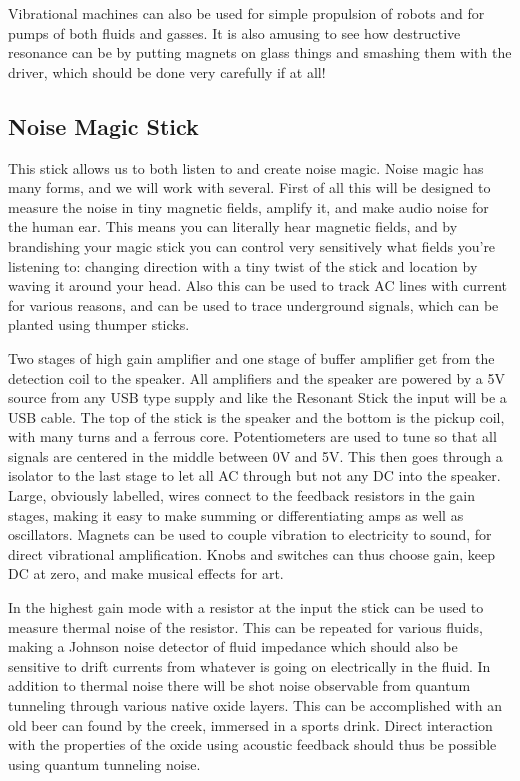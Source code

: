 Vibrational machines can also be used for simple propulsion of robots
and for pumps of both fluids and gasses. It is also amusing to see how
destructive resonance can be by putting magnets on glass things and
smashing them with the driver, which should be done very carefully if at
all!

\subsection{Noise Magic Stick}\label{noise-magic-stick}

This stick allows us to both listen to and create noise magic. Noise
magic has many forms, and we will work with several. First of all this
will be designed to measure the noise in tiny magnetic fields, amplify
it, and make audio noise for the human ear. This means you can literally
hear magnetic fields, and by brandishing your magic stick you can
control very sensitively what fields you're listening to: changing
direction with a tiny twist of the stick and location by waving it
around your head. Also this can be used to track AC lines with current
for various reasons, and can be used to trace underground signals, which
can be planted using thumper sticks.

Two stages of high gain amplifier and one stage of buffer amplifier get
from the detection coil to the speaker. All amplifiers and the speaker
are powered by a 5V source from any USB type supply and like the
Resonant Stick the input will be a USB cable. The top of the stick is
the speaker and the bottom is the pickup coil, with many turns and a
ferrous core. Potentiometers are used to tune so that all signals are
centered in the middle between 0V and 5V. This then goes through a
isolator to the last stage to let all AC through but not any DC into the
speaker. Large, obviously labelled, wires connect to the feedback
resistors in the gain stages, making it easy to make summing or
differentiating amps as well as oscillators. Magnets can be used to
couple vibration to electricity to sound, for direct vibrational
amplification. Knobs and switches can thus choose gain, keep DC at zero,
and make musical effects for art.

In the highest gain mode with a resistor at the input the stick can be
used to measure thermal noise of the resistor. This can be repeated for
various fluids, making a Johnson noise detector of fluid impedance which
should also be sensitive to drift currents from whatever is going on
electrically in the fluid. In addition to thermal noise there will be
shot noise observable from quantum tunneling through various native
oxide layers. This can be accomplished with an old beer can found by the
creek, immersed in a sports drink. Direct interaction with the
properties of the oxide using acoustic feedback should thus be possible
using quantum tunneling noise.

